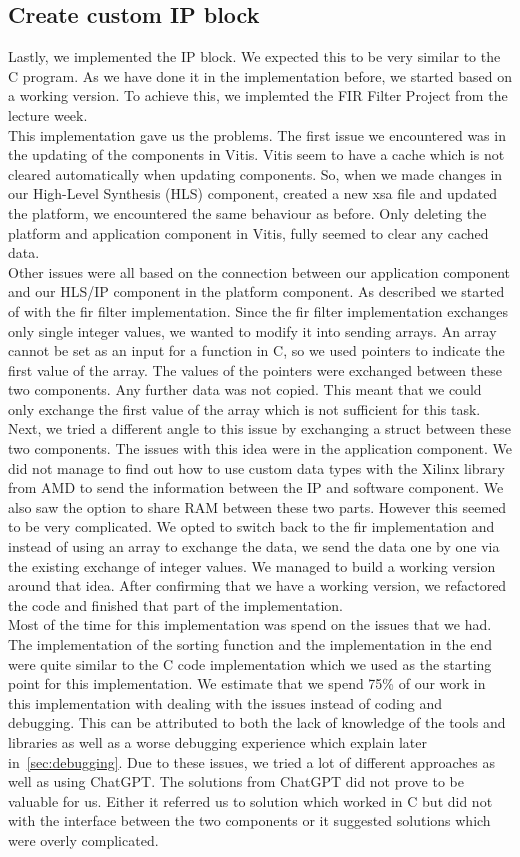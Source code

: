 \documentclass[conference]{IEEEtran}
\begin{document}
\subsection{Create custom IP block}
Lastly, we implemented the IP block. We expected this to be very similar to the C program. As we have done it in the implementation before, we started based on a working version. To achieve this, we implemted the FIR Filter Project from the lecture week. \\
This implementation gave us the problems. The first issue we encountered was in the updating of the components in Vitis. Vitis seem to have a cache which is not cleared automatically when updating components. So, when we made changes in our High-Level Synthesis (HLS) component, created a new xsa file and updated the platform, we encountered the same behaviour as before. Only deleting the platform and application component in Vitis, fully seemed to clear any cached data. \\
Other issues were all based on the connection between our application component and our HLS/IP component in the platform component. As described we started of with the fir filter implementation. Since the fir filter implementation exchanges only single integer values, we wanted to modify it into sending arrays. An array cannot be set as an input for a function in C, so we used pointers to indicate the first value of the array. The values of the pointers were exchanged between these two components. Any further data was not copied. This meant that we could only exchange the first value of the array which is not sufficient for this task. Next, we tried a different angle to this issue by exchanging a struct between these two components. The issues with this idea were in the application component. We did not manage to find out how to use custom data types with the Xilinx library from AMD to send the information between the IP and software component. We also saw the option to share RAM between these two parts. However this seemed to be very complicated. We opted to switch back to the fir implementation and instead of using an array to exchange the data, we send the data one by one via the existing exchange of integer values. We managed to build a working version around that idea. After confirming that we have a working version, we refactored the code and finished that part of the implementation. \\
Most of the time for this implementation was spend on the issues that we had. The implementation of the sorting function and the implementation in the end were quite similar to the C code implementation which we used as the starting point for this implementation. We estimate that we spend 75\% of our work in this implementation with dealing with the issues instead of coding and debugging. This can be attributed to both the lack of knowledge of the tools and libraries as well as a worse debugging experience which explain later in~\ref{sec:debugging}. Due to these issues, we tried a lot of different approaches as well as using ChatGPT. The solutions from ChatGPT did not prove to be valuable for us. Either it referred us to solution which worked in C but did not with the interface between the two components or it suggested solutions which were overly complicated.
\end{document}
